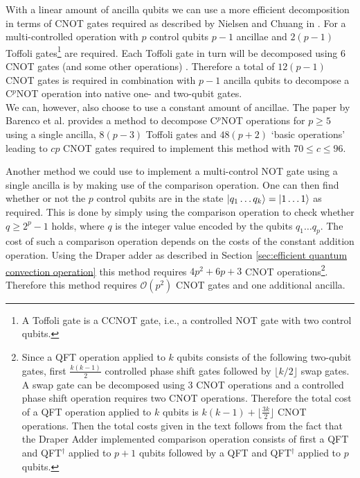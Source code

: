 With a linear amount of ancilla qubits we can use a more efficient decomposition in terms of CNOT gates required as described by Nielsen and Chuang in \cite{mikeandike}. For a multi-controlled operation with $p$ control qubits $p-1$ ancillae and $2(p-1)$ Toffoli gates\footnote{A Toffoli gate is a CCNOT gate, i.e., a controlled NOT gate with two control qubits.} are required. Each Toffoli gate in turn will be decomposed using 6 CNOT gates (and some other operations) \cite{mikeandike}. Therefore a total of $12(p-1)$ CNOT gates is required in combination with $p-1$ ancilla qubits to decompose a C$^p$NOT operation into native one- and two-qubit gates. \\

We can, however, also choose to use a constant amount of ancillae. 
The paper by Barenco et al. \cite{Barenco1995} provides a method to decompose C$^p$NOT operations for $p\geq 5$ using a single ancilla, $8(p-3)$ Toffoli gates and $ 48 (p+2)$ `basic operations' leading to $c p$ CNOT gates required to implement this method with $70 \leq c \leq 96$.

Another method we could use to implement a multi-control NOT gate using a single ancilla is by making use of the comparison operation. One can then find whether or not the $p$ control qubits are in the state $\ket{q_1 \dots q_k} = \ket{1 \dots 1}$ as required. This is done by simply using the comparison operation to check whether $q \geq 2^p-1$ holds, where $q$ is the integer value encoded by the qubits $q_1 \dots q_p$. The cost of such a comparison operation depends on the costs of the constant addition operation. Using the Draper adder as described in Section \ref{sec:efficient quantum convection operation} this method requires $4p^2 + 6p + 3$ CNOT operations\footnote{Since a QFT operation applied to $k$ qubits consists of the following two-qubit gates, first $\frac{k(k-1)}{2}$ controlled phase shift gates followed by $\lfloor k/2 \rfloor$ swap gates. A swap gate can be decomposed using 3 CNOT operations and a controlled phase shift operation requires two CNOT operations. Therefore the total cost of a QFT operation applied to $k$ qubits is $k(k-1) + \lfloor \frac{3k}{2} \rfloor$ CNOT operations. Then the total costs given in the text follows from the fact that the Draper Adder implemented comparison operation consists of first a QFT and QFT$^\dagger$ applied to $p+1$ qubits followed by  a QFT and QFT$^\dagger$ applied to $p$ qubits.}. Therefore this method requires $\mathcal{O} \left ( p^2\right )$ CNOT gates and one additional ancilla.

